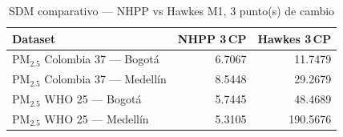 \begin{table}[htbp]
\centering
\caption{SDM comparativo --- NHPP vs Hawkes M1, 3 punto(s) de cambio}
\label{tab:comp_sdm_3cp}
\begin{tabular}{lrr}
\toprule
Dataset & NHPP 3\,CP & Hawkes 3\,CP \\
\midrule
PM$_{2.5}$ Colombia 37 --- Bogot\'{a} & 6.7067 & 11.7479 \\
PM$_{2.5}$ Colombia 37 --- Medell\'{i}n & 8.5448 & 29.2679 \\
PM$_{2.5}$ WHO 25 --- Bogot\'{a} & 5.7445 & 48.4689 \\
PM$_{2.5}$ WHO 25 --- Medell\'{i}n & 5.3105 & 190.5676 \\
\bottomrule
\end{tabular}
\end{table}
